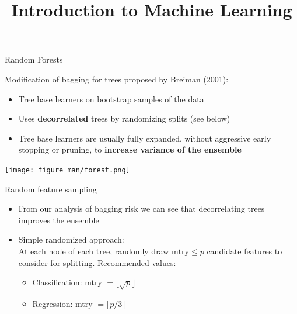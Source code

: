 \documentclass[11pt,compress,t,notes=noshow, xcolor=table]{beamer}
\title{Introduction to Machine Learning}
\institute{\href{https://compstat-lmu.github.io/lecture_i2ml/}{compstat-lmu.github.io/lecture\_i2ml}}
\date{}
\begin{document}









\sloppy

\begin{vbframe}{Random Forests}

Modification of bagging for trees proposed by Breiman (2001):

\begin{itemize}
  \item Tree base learners on bootstrap samples of the data
  \item Uses \textbf{decorrelated} trees by randomizing splits (see below)
  \item Tree base learners are usually fully expanded, without aggressive early stopping or
    pruning, to \textbf{increase variance of the ensemble}
\end{itemize}
\begin{center}
\texttt{[image: figure\_man/forest.png]}
\end{center}
\end{vbframe}



\begin{vbframe}{Random feature sampling}

\begin{itemize}
  \item From our analysis of bagging risk we can see that decorrelating trees improves the ensemble
  \item Simple randomized approach:\\
    At each node of each tree, randomly draw $\text{mtry} \le p$ candidate features to consider for splitting. Recommended values:
  \begin{itemize}
    \item Classification: mtry $ = \lfloor \sqrt{p} \rfloor$
    \item Regression: mtry $ = \lfloor p/3 \rfloor$
  \end{itemize}
\end{itemize}
\end{vbframe}
\end{document}
